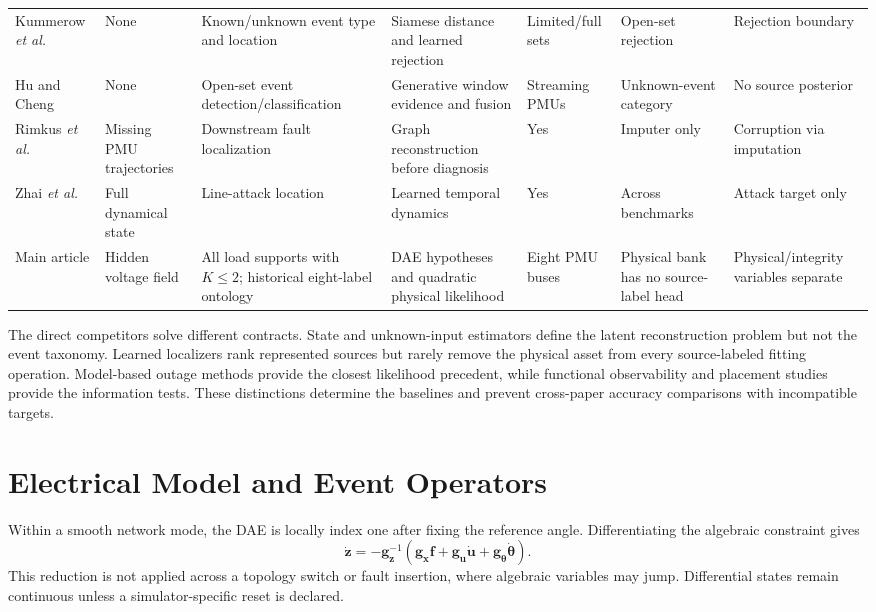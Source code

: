\documentclass{ieeeaccess}
\begin{document}
\begin{table}[t]
\begin{tabularx}{\textwidth}{@{}lXXXXXX@{}}
Kummerow \emph{et al.} \cite{kummerow2023sigmoid} & None & Known/unknown event type and location & Siamese distance and learned rejection & Limited/full sets & Open-set rejection & Rejection boundary \\
Hu and Cheng \cite{hu2026openset} & None & Open-set event detection/classification & Generative window evidence and fusion & Streaming PMUs & Unknown-event category & No source posterior \\
Rimkus \emph{et al.} \cite{rimkus2025gnn} & Missing PMU trajectories & Downstream fault localization & Graph reconstruction before diagnosis & Yes & Imputer only & Corruption via imputation \\
Zhai \emph{et al.} \cite{zhai2025partial} & Full dynamical state & Line-attack location & Learned temporal dynamics & Yes & Across benchmarks & Attack target only \\
Main article & Hidden voltage field & All load supports with $K\le2$; historical eight-label ontology & DAE hypotheses and quadratic physical likelihood & Eight PMU buses & Physical bank has no source-label head & Physical/integrity variables separate \\
\bottomrule
\end{tabularx}
\end{table}

The direct competitors solve different contracts. State and unknown-input estimators define the latent reconstruction problem but not the event taxonomy. Learned localizers rank represented sources but rarely remove the physical asset from every source-labeled fitting operation. Model-based outage methods provide the closest likelihood precedent, while functional observability and placement studies provide the information tests. These distinctions determine the baselines and prevent cross-paper accuracy comparisons with incompatible targets.

\section{Electrical Model and Event Operators}

Within a smooth network mode, the DAE is locally index one after fixing the reference angle. Differentiating the algebraic constraint gives
\begin{equation}
 \dot{\bm z}=-\bm g_{\bm z}^{-1}
 (\bm g_{\bm x}\bm f+\bm g_{\bm u}\dot{\bm u}
 +\bm g_{\bm\theta}\dot{\bm\theta}).
 \label{eq:supp-index-one}
\end{equation}
This reduction is not applied across a topology switch or fault insertion, where algebraic variables may jump. Differential states remain continuous unless a simulator-specific reset is declared.
\end{document}
